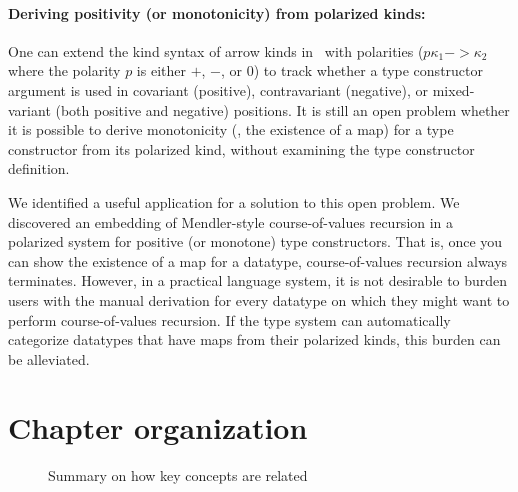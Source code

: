 \paragraph{Deriving positivity (or monotonicity) from polarized kinds:}
One can extend the kind syntax of arrow kinds in \Fw\ with polarities
($p\kappa_1 -> \kappa_2$ where the polarity $p$ is either $+$, $-$, or $0$)
to track whether a type constructor argument is used in
covariant (positive), contravariant (negative), or
mixed-variant (both positive and negative) positions.
It is still an open problem whether it is possible to derive monotonicity
(\ie, the  existence of a map) for a type constructor from its polarized kind,
without examining the type constructor definition.

We identified a useful application for a solution to this open problem.
We discovered an embedding of Mendler-style course-of-values recursion in
a polarized system for positive (or monotone) type constructors.
That is, once you can show the existence of a map for a datatype,
course-of-values recursion always terminates.
However, in a practical language system, it is not desirable to burden users
with the manual derivation for every datatype on which they might want to
perform course-of-values recursion. If the type system can automatically
categorize datatypes that have maps from their polarized kinds,
this burden can be alleviated.

\section{Chapter organization}\label{sec:intro:overview}
\begin{figure}

\caption{Summary on how key concepts are related}
\label{fig:overview}
\end{figure}

